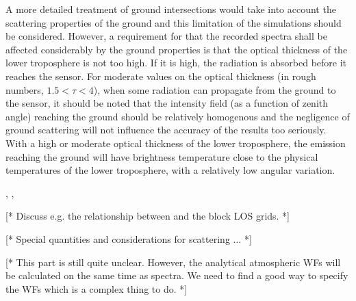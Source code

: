 A more detailed treatment of ground intersections would take into
account the scattering properties of the ground and this limitation of
the simulations should be considered. However, a requirement for that
the recorded spectra shall be affected considerably by the ground
properties is that the optical thickness of the lower troposphere is
not too high. If it is high, the radiation is absorbed before it
reaches the sensor. For moderate values on the optical thickness (in
rough numbers, $1.5<\tau<4$), when some radiation can propagate
from the ground to the sensor, it should be noted that the intensity
field (as a function of zenith angle) reaching the ground should be
relatively homogenous and the negligence of ground scattering will not
influence the accuracy of the results too seriously. With a high or
moderate optical thickness of the lower troposphere, the emission
reaching the ground will have brightness temperature close to the
physical temperatures of the lower troposphere, with a relatively low
angular variation.



\label{sec:fm_defs:sensor2}

, , 


\label{sec:fm_defs:howtomeasseq}

[* Discuss e.g. the relationship between  and the block LOS grids. *]


\label{sec:fm_defs:scattering}

[* Special quantities and considerations for scattering ... *]



\label{sec:fm_defs:wfs}

[* This part is still quite unclear. However, the analytical
atmospheric WFs will be calculated on the same time as spectra. We
need to find a good way to specify the WFs which is a complex thing to
do. *]


